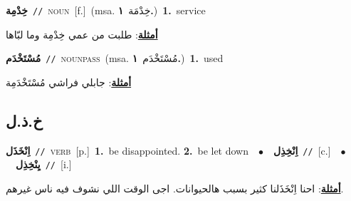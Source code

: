 \documentclass[10pt,a4paper,twoside]{article} %
\begin{document}
\begin{multicols}{2}
{\setlength\topsep{0pt}\textbf{\foreignlanguage{arabic}{خِدْمِة}}\ {\color{gray}\texttt{//}\color{black}}\ \textsc{noun}\ [f.]\ \color{gray}(msa. \foreignlanguage{arabic}{خِدْمَة}~\foreignlanguage{arabic}{\textbf{١.}})\color{black}\ \textbf{1.}~service\  \begin{flushright}\color{gray}\foreignlanguage{arabic}{\textbf{\underline{\foreignlanguage{arabic}{أمثلة}}}: طلبت من عمي خِدْمِة وما لبّاها}\end{flushright}\color{black}} \vspace{2mm}

{\setlength\topsep{0pt}\textbf{\foreignlanguage{arabic}{مُسْتَخْدَم}}\ {\color{gray}\texttt{//}\color{black}}\ \textsc{noun\textunderscore pass}\ \color{gray}(msa. \foreignlanguage{arabic}{مُسْتَخْدَم}~\foreignlanguage{arabic}{\textbf{١.}})\color{black}\ \textbf{1.}~used\  \begin{flushright}\color{gray}\foreignlanguage{arabic}{\textbf{\underline{\foreignlanguage{arabic}{أمثلة}}}: جابلي فراشي مُسْتَخْدَمِة}\end{flushright}\color{black}} \vspace{2mm}

\vspace{-3mm}
\subsection*{\color{blue}\foreignlanguage{arabic}{خ.ذ.ل}\color{blue}{}} 

{\setlength\topsep{0pt}\textbf{\foreignlanguage{arabic}{اِنْخَذَل}}\ {\color{gray}\texttt{//}\color{black}}\ \textsc{verb}\ [p.]\ \textbf{1.}~be disappointed.  \textbf{2.}~be let down\ \ $\bullet$\ \ \setlength\topsep{0pt}\textbf{\foreignlanguage{arabic}{اِنْخِذِل}}\ {\color{gray}\texttt{//}\color{black}}\ [c.]\ \ $\bullet$\ \ \setlength\topsep{0pt}\textbf{\foreignlanguage{arabic}{يِنْخِذِل}}\ {\color{gray}\texttt{//}\color{black}}\ [i.]\  \begin{flushright}\color{gray}\foreignlanguage{arabic}{\textbf{\underline{\foreignlanguage{arabic}{أمثلة}}}: احنا اِنْخَذَلنا كثير بسبب هالحيوانات. اجى الوقت اللي نشوف فيه ناس غيرهم.}\end{flushright}\color{black}} \vspace{2mm}


\end{multicols}
\end{document}
